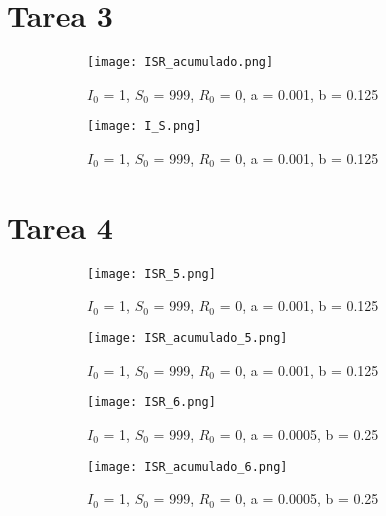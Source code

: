 \section{Tarea 3}

\begin{figure}[H]
	\centering
	\begin{subfigure}[b]{0.8\textwidth}
		\centering
		\texttt{[image: ISR\_acumulado.png]}
		\caption{$I_0$ = 1, $S_0$ = 999, $R_0$ = 0, a = 0.001, b = 0.125}
	\end{subfigure}
	\hfill
	\begin{subfigure}[b]{0.8\textwidth}
		\centering
		\texttt{[image: I\_S.png]}
		\caption{$I_0$ = 1, $S_0$ = 999, $R_0$ = 0, a = 0.001, b = 0.125}
	\end{subfigure}
	\caption{}
\end{figure}

\section{Tarea 4}
\begin{figure}[H]
	\centering
	\begin{subfigure}[b]{0.8\textwidth}
		\centering
		\texttt{[image: ISR\_5.png]}
		\caption{$I_0$ = 1, $S_0$ = 999, $R_0$ = 0, a = 0.001, b = 0.125}
	\end{subfigure}
	\hfill
	\begin{subfigure}[b]{0.8\textwidth}
		\centering
		\texttt{[image: ISR\_acumulado\_5.png]}
		\caption{$I_0$ = 1, $S_0$ = 999, $R_0$ = 0, a = 0.001, b = 0.125}
	\end{subfigure}
	\caption{}
\end{figure}
\begin{figure}[H]
	\centering
	\begin{subfigure}[b]{0.8\textwidth}
		\centering
		\texttt{[image: ISR\_6.png]}
		\caption{$I_0$ = 1, $S_0$ = 999, $R_0$ = 0, a = 0.0005, b = 0.25}
	\end{subfigure}
	\hfill
	\begin{subfigure}[b]{0.8\textwidth}
		\centering
		\texttt{[image: ISR\_acumulado\_6.png]}
		\caption{$I_0$ = 1, $S_0$ = 999, $R_0$ = 0, a = 0.0005, b = 0.25}
	\end{subfigure}
	\caption{}
\end{figure}

